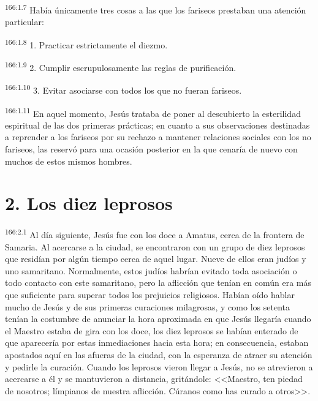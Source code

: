 \par 
\textsuperscript{166:1.7} Había únicamente tres cosas a las que los fariseos prestaban una atención particular:

\par 
\textsuperscript{166:1.8} 1. Practicar estrictamente el diezmo.

\par 
\textsuperscript{166:1.9} 2. Cumplir escrupulosamente las reglas de purificación.

\par 
\textsuperscript{166:1.10} 3. Evitar asociarse con todos los que no fueran fariseos.

\par 
\textsuperscript{166:1.11} En aquel momento, Jesús trataba de poner al descubierto la esterilidad espiritual de las dos primeras prácticas; en cuanto a sus observaciones destinadas a reprender a los fariseos por su rechazo a mantener relaciones sociales con los no fariseos, las reservó para una ocasión posterior en la que cenaría de nuevo con muchos de estos mismos hombres.

\section*{2. Los diez leprosos}
\par 
\textsuperscript{166:2.1} Al día siguiente, Jesús fue con los doce a Amatus, cerca de la frontera de Samaria. Al acercarse a la ciudad, se encontraron con un grupo de diez leprosos que residían por algún tiempo cerca de aquel lugar. Nueve de ellos eran judíos y uno samaritano. Normalmente, estos judíos habrían evitado toda asociación o todo contacto con este samaritano, pero la aflicción que tenían en común era más que suficiente para superar todos los prejuicios religiosos. Habían oído hablar mucho de Jesús y de sus primeras curaciones milagrosas, y como los setenta tenían la costumbre de anunciar la hora aproximada en que Jesús llegaría cuando el Maestro estaba de gira con los doce, los diez leprosos se habían enterado de que aparecería por estas inmediaciones hacia esta hora; en consecuencia, estaban apostados aquí en las afueras de la ciudad, con la esperanza de atraer su atención y pedirle la curación. Cuando los leprosos vieron llegar a Jesús, no se atrevieron a acercarse a él y se mantuvieron a distancia, gritándole: <<Maestro, ten piedad de nosotros; límpianos de nuestra aflicción. Cúranos como has curado a otros>>.

